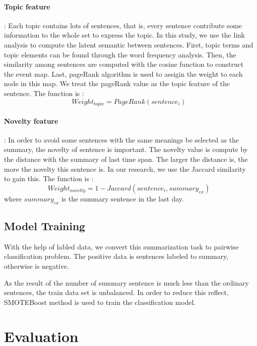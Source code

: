 \documentclass{llncs}
\begin{document}
\paragraph{Topic feature}: Each topic contains lots of sentences, that is, every sentence contribute some information to the whole set to express the topic. In this study, we use the link analysis to compute the latent semantic between sentences. First, topic terms and topic elements can be found through the word frequency analysis. Then, the similarity among sentences are computed with the cosine function to construct the event map. Last, pageRank algorithm is used to assigin the weight to each node in this map. We treat the pageRank value as the topic feature of the sentence. The function is :
\begin{equation}
Weight_{topic} = PageRank(sentence_i)
\end{equation}

\paragraph{Novelty feature}: In order to avoid some sentences with the same meanings be selected as the summary, the novelty of sentence is important. The novelty value is compute by the distance with the summary of last time span. The larger the distance is, the more the novelty this sentence is. In our research, we use the Jaccard similarity to gain this. The function is :
\begin{equation}
Weight_{novelty} = 1 - Jaccard(sentence_i, summary_{ex})
\end{equation}
where $summary_{ex}$ is the summary sentence in the last day.


\subsection{Model Training}

With the help of labled data, we convert this summarization task to pairwise classification problem. The positive data is sentences labeled to summary, otherwise is negative. 

As the result of the number of summary sentence is much less than the ordinary sentences, the train data set is unbalanced. In order to reduce this reflect, SMOTEBoost method is used to train the classification model.

%
\section{Evaluation}
%
\end{document}
